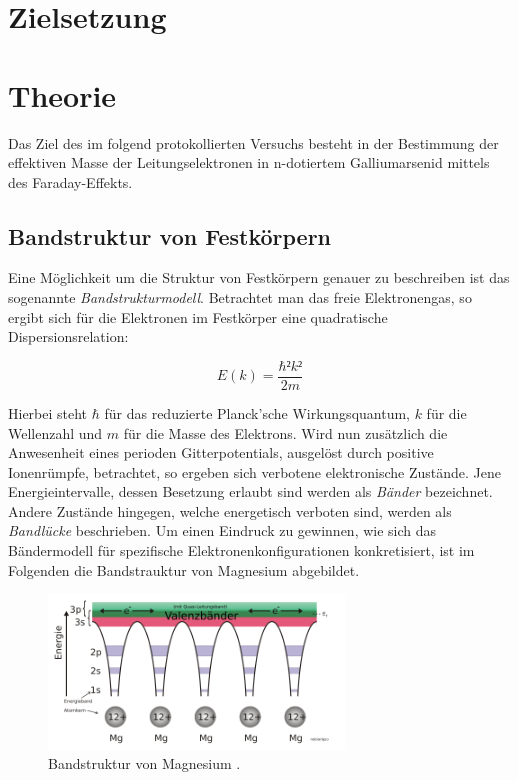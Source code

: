 %

%
\section{Zielsetzung}
\label{sec:Theorie}

\section{Theorie}

Das Ziel des im folgend protokollierten Versuchs besteht in der Bestimmung der effektiven Masse der Leitungselektronen in 
n-dotiertem Galliumarsenid mittels des Faraday-Effekts. 

\subsection{Bandstruktur von Festkörpern}

\noindent Eine Möglichkeit um die Struktur von Festkörpern genauer zu beschreiben ist das sogenannte \textit{Bandstrukturmodell}. Betrachtet man das 
freie Elektronengas, so ergibt sich für die Elektronen im Festkörper eine quadratische Dispersionsrelation:

\begin{equation}
    E(k) = \frac{\hbar²{}k²}{2m}
\end{equation}

\noindent Hierbei steht $\hbar$ für das reduzierte Planck'sche Wirkungsquantum, $k$ für die Wellenzahl und $m$ für die Masse des Elektrons.
Wird nun zusätzlich die Anwesenheit eines perioden Gitterpotentials, ausgelöst durch positive Ionenrümpfe, betrachtet, so ergeben sich verbotene
elektronische Zustände. Jene Energieintervalle, dessen Besetzung erlaubt sind werden als \textit{Bänder} bezeichnet. Andere Zustände hingegen, welche
energetisch verboten sind, werden als \textit{Bandlücke} beschrieben. Um einen Eindruck zu gewinnen, wie sich das Bändermodell für spezifische
Elektronenkonfigurationen konkretisiert, ist im Folgenden die Bandstrauktur von Magnesium abgebildet. 

\begin{figure}[H]
    \centering
    \includegraphics[width=0.7\textwidth]{content/BandstrukturMagn.png}
    \caption{Bandstruktur von Magnesium \cite{Magnesium}.}
    \label{fig:Magnesium}
\end{figure}

